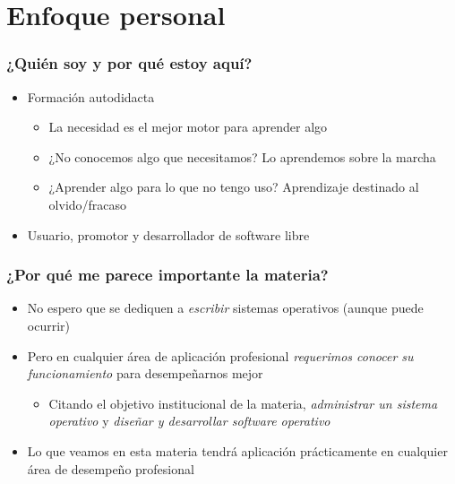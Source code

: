 \documentclass[bigger]{beamer}
\begin{document}
\section{Enfoque personal}
\label{sec-3}
\begin{frame}[fragile]\frametitle{¿Quién soy y por qué estoy aquí?}
\label{sec-3_1}

\begin{itemize}
\item Formación autodidacta

\begin{itemize}
\item La necesidad es el mejor motor para aprender algo
\item ¿No conocemos algo que necesitamos? Lo aprendemos sobre la marcha
\item ¿Aprender algo para lo que no tengo uso? Aprendizaje destinado al
    olvido/fracaso
\end{itemize}

\item Usuario, promotor y desarrollador de software libre
\end{itemize}
\end{frame}
\begin{frame}[fragile]\frametitle{¿Por qué me parece importante la materia?}
\label{sec-3_2}

\begin{itemize}
\item No espero que se dediquen a \emph{escribir} sistemas operativos (aunque
  puede ocurrir)
\item Pero en cualquier área de aplicación profesional \emph{requerimos conocer   su funcionamiento} para desempeñarnos mejor

\begin{itemize}
\item Citando el objetivo institucional de la materia, \emph{administrar un     sistema operativo} y \emph{diseñar y desarrollar software operativo}
\end{itemize}

\item Lo que veamos en esta materia tendrá aplicación prácticamente en
  cualquier área de desempeño profesional
\end{itemize}
\end{frame}
\end{document}
